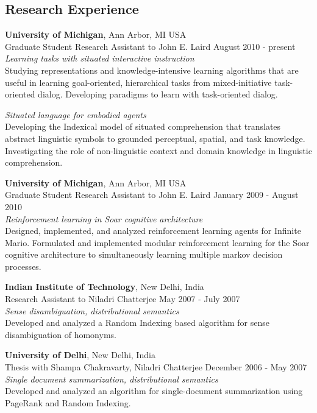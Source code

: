 \documentclass[margin,line,11pt]{res}
\begin{document}
\begin{resume}
\section{\sc Research Experience}
{\bf University of Michigan}, Ann Arbor, MI USA \\ {Graduate Student
  Research Assistant} to John E. Laird \hfill August 2010 -
present\\ \emph{Learning tasks with situated interactive instruction}
\\ Studying representations and knowledge-intensive learning algorithms
that are useful in learning goal-oriented, hierarchical tasks from
mixed-initiative task-oriented dialog. Developing paradigms to learn with task-oriented dialog.

\emph{Situated language for embodied agents}\\ 
Developing the Indexical model of situated comprehension that
translates abstract linguistic symbols to grounded perceptual, spatial, and
task knowledge. Investigating the role of non-linguistic context and
domain knowledge in linguistic comprehension. 

{\bf University of Michigan}, Ann Arbor, MI USA \\
{Graduate Student Research Assistant} to John E. Laird \hfill January 2009 - August 2010\\
\emph{Reinforcement learning in Soar cognitive architecture}\\
 Designed, implemented, and analyzed reinforcement learning agents for
 Infinite Mario. Formulated and implemented modular reinforcement learning for the Soar cognitive
 architecture to simultaneously learning multiple markov decision processes. 

{\bf Indian Institute of Technology}, New Delhi, India \\
{Research Assistant} to Niladri Chatterjee \hfill May 2007 - July 2007\\
\emph{Sense disambiguation, distributional semantics}\\
Developed and analyzed a Random Indexing based algorithm for sense disambiguation of homonyms.

{\bf University of Delhi}, New Delhi, India \\
{Thesis} with Shampa Chakravarty, Niladri Chatterjee \hfill December 2006 - May 2007\\
\emph{Single document summarization, distributional semantics}\\
Developed and analyzed an algorithm for single-document summarization using PageRank and Random Indexing.



\end{resume}
\end{document}
